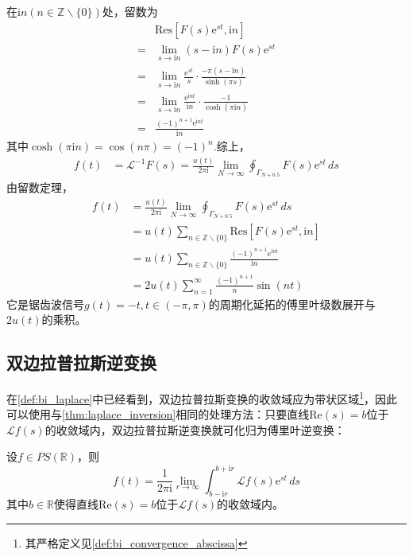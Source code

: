 \begin{example}
    在$\mathrm{i}n(n\in\mathbb{Z}\backslash\{0\})$处，留数为
    \begin{align*}
        &\mathrm{Res}[F(s)\mathrm{e}^{st},\mathrm{i}n]\\
        =&\lim_{s\to \mathrm{i}n}(s-\mathrm{i}n)F(s)\mathrm{e}^{st}\\
        =&\lim_{s\to \mathrm{i}n}\frac{\mathrm{e}^{st}}{s}\cdot\frac{-\pi(s-\mathrm{i}n)}{\sinh(\pi s)}\\
        =&\lim_{s\to \mathrm{i}n}\frac{\mathrm{e}^{\mathrm{i}nt}}{\mathrm{i}n}\cdot\frac{-1}{\cosh(\pi \mathrm{i}n)}\\
        =&\frac{(-1)^{n+1}\mathrm{e}^{\mathrm{i}nt}}{\mathrm{i}n}
    \end{align*}
    其中$\cosh(\pi \mathrm{i}n)=\cos(n\pi)=(-1)^n$.综上，
    \begin{align*}
        f(t)&=\mathcal{L}^{-1} F(s)=\frac{u(t)}{2\pi \mathrm{i}}\lim_{N\to\infty}\oint_{\Gamma_{N+0.5}}F(s)\mathrm{e}^{st}\,ds
    \end{align*}
    由留数定理，
    \begin{align*}
        f(t)&=\frac{u(t)}{2\pi \mathrm{i}}\lim_{N\to\infty}\oint_{\Gamma_{N+0.5}}F(s)\mathrm{e}^{st}\,ds\\
        &=u(t)\sum_{n\in\mathbb{Z}\backslash\{0\}}\mathrm{Res}[F(s)\mathrm{e}^{st},\mathrm{i}n]\\
        &=u(t)\sum_{n\in\mathbb{Z}\backslash\{0\}}\frac{(-1)^{n+1}\mathrm{e}^{\mathrm{i}nt}}{\mathrm{i}n}\\
        &=2u(t)\sum_{n=1}^{\infty}\frac{(-1)^{n+1}}{n}\sin(nt)
    \end{align*}
    它是锯齿波信号$g(t)=-t,t\in(-\pi,\pi)$的周期化延拓的傅里叶级数展开与$2u(t)$的乘积。
\end{example}

\subsection{双边拉普拉斯逆变换}\label{sub:bi_laplace_inv}

在\cref{def:bi_laplace}中已经看到，双边拉普拉斯变换的收敛域应为带状区域\footnote{其严格定义见\cref{def:bi_convergence_abscissa}}，因此可以使用与\cref{thm:laplace_inversion}相同的处理方法：只要直线$\mathrm{Re}(s)=b$位于$\mathcal{L} f(s)$的收敛域内，双边拉普拉斯逆变换就可化归为傅里叶逆变换：
\begin{theorem}[双边拉普拉斯逆变换]\label{thm:bi_laplace_inv}
    设$f\in PS(\mathbb{R})$，则
    \[f(t)=\frac{1}{2\pi \mathrm{i}}\lim_{r\to\infty}\int_{b-\mathrm{i}r}^{b +\mathrm{i}r}\mathcal{L} f(s)\mathrm{e}^{st}\,ds\]
    其中$b\in\mathbb{R}$使得直线$\mathrm{Re}(s)=b$位于$\mathcal{L} f(s)$的收敛域内。
\end{theorem}

